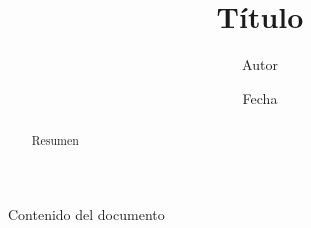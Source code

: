 \documentclass[a4paper,10pt]{article}
\title{Título}
\author{Autor}
\date{Fecha}
\begin{document}
\maketitle

\begin{abstract}
Resumen
\end{abstract}

\tableofcontents

Contenido del documento
\end{document}
